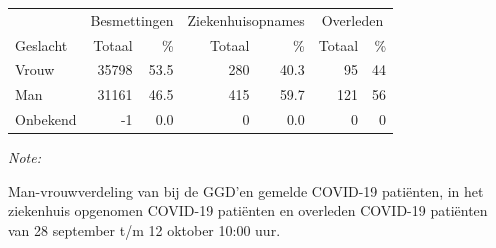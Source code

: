 \documentclass[
  english,
  man,floatsintext]{apa6}
\begin{document}
\begin{table}[H]
\centering\begingroup\fontsize{11}{13}\selectfont

\begin{threeparttable}
\begin{tabular}{lrrrrrr}
\toprule
\multicolumn{1}{c}{ } & \multicolumn{2}{c}{Besmettingen} & \multicolumn{2}{c}{Ziekenhuisopnames} & \multicolumn{2}{c}{Overleden} \\
\cmidrule(l{3pt}r{3pt}){2-3} \cmidrule(l{3pt}r{3pt}){4-5} \cmidrule(l{3pt}r{3pt}){6-7}
Geslacht & Totaal & \% & Totaal & \% & Totaal & \%\\
\midrule
Vrouw & 35798 & 53.5 & 280 & 40.3 & 95 & 44\\
Man & 31161 & 46.5 & 415 & 59.7 & 121 & 56\\
Onbekend & -1 & 0.0 & 0 & 0.0 & 0 & 0\\
\bottomrule
\end{tabular}
\begin{tablenotes}
\item \textit{Note: } 
\item Man-vrouwverdeling van bij de GGD’en gemelde COVID-19 patiënten, in het ziekenhuis opgenomen COVID-19 patiënten en overleden COVID-19 patiënten van 28 september t/m 12 oktober 10:00 uur.
\end{tablenotes}
\end{threeparttable}
\endgroup{}
\end{table}
\newpage
\end{document}
